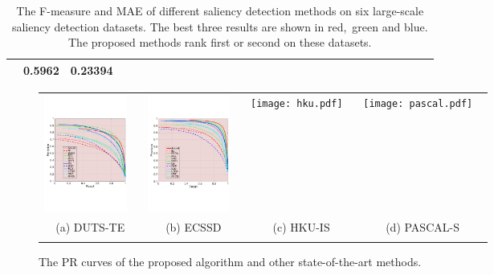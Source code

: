 \documentclass[10pt,twocolumn,letterpaper]{article}
\begin{document}
\begin{table}
\begin{center}
\begin{tabular}{|c|c|c|c|c|c|c|c|c|c|c|c|c|c|c|c|c|c|c|c|c|c|c|c|c|||c|c|c|c|c|c|c|c|||}
&\multicolumn{2}{|c|}{0.5962}&\multicolumn{2}{|c|}{0.23394}%
\\
\hline
\end{tabular}
\vspace{1mm}
\caption{The F-measure and MAE of different saliency detection methods on six large-scale saliency detection datasets. The best three results are shown in \textcolor[rgb]{1,0,0}{red},~\textcolor[rgb]{0,1,0}{green} and \textcolor[rgb]{0,0,1}{blue}. The proposed methods rank first or second on these datasets.}
\vspace{-7mm}
\label{table:fauc}
\end{center}
\end{table}
\begin{figure}
\begin{center}
\begin{tabular}{@{}c@{}c@{}c@{}c}
\includegraphics[width=0.245\linewidth,height=3.85cm]{duts.pdf} \ &
\includegraphics[width=0.245\linewidth,height=3.85cm]{ecssd.pdf} \ &
\texttt{[image: hku.pdf]} \ &
\texttt{[image: pascal.pdf]} \ \\
 {\small(a) DUTS-TE} & {\small(b) ECSSD} & {\small(c) HKU-IS} & {\small(d) PASCAL-S}\\ \\
\end{tabular}
\vspace{-6mm}
\caption{The PR curves of the proposed algorithm and other state-of-the-art methods.
\label{fig:PR-curve}}
\end{center}
\vspace{-10mm}
\end{figure}
\end{document}
